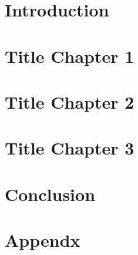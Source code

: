 \documentclass[12pt, twoside]{report}
\begin{document}
    
    \nocite{*}
    
    
    
    \pagestyle{empty}
    
    \tableofcontents
    \pagestyle{fancy}
    \chapter{Introduction}
    
    \chapter{Title Chapter 1}
    
    \chapter{Title Chapter 2}
    
    \chapter{Title Chapter 3}
    
    \chapter{Conclusion}
    
    \chapter*{Appendx}
    
    
    \printbibliography
\end{document}
